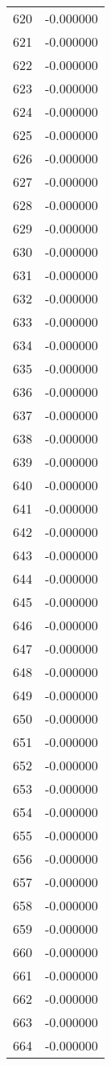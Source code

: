 \documentclass[12pt]{article}
\begin{document}
\begin{longtable}{@{}cc@{}}
620 & -0.000000 \\
621 & -0.000000 \\
622 & -0.000000 \\
623 & -0.000000 \\
624 & -0.000000 \\
625 & -0.000000 \\
626 & -0.000000 \\
627 & -0.000000 \\
628 & -0.000000 \\
629 & -0.000000 \\
630 & -0.000000 \\
631 & -0.000000 \\
632 & -0.000000 \\
633 & -0.000000 \\
634 & -0.000000 \\
635 & -0.000000 \\
636 & -0.000000 \\
637 & -0.000000 \\
638 & -0.000000 \\
639 & -0.000000 \\
640 & -0.000000 \\
641 & -0.000000 \\
642 & -0.000000 \\
643 & -0.000000 \\
644 & -0.000000 \\
645 & -0.000000 \\
646 & -0.000000 \\
647 & -0.000000 \\
648 & -0.000000 \\
649 & -0.000000 \\
650 & -0.000000 \\
651 & -0.000000 \\
652 & -0.000000 \\
653 & -0.000000 \\
654 & -0.000000 \\
655 & -0.000000 \\
656 & -0.000000 \\
657 & -0.000000 \\
658 & -0.000000 \\
659 & -0.000000 \\
660 & -0.000000 \\
661 & -0.000000 \\
662 & -0.000000 \\
663 & -0.000000 \\
664 & -0.000000 \\

\end{longtable}
\end{document}
